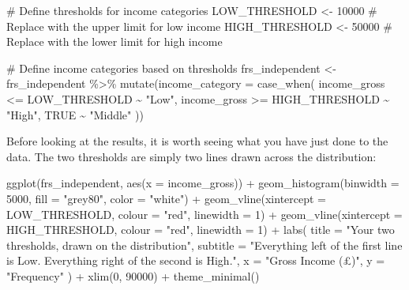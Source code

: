 \documentclass[
  letterpaper,
  DIV=11,
  numbers=noendperiod]{scrreprt}
\newenvironment{Shaded}{\begin{snugshade}}{\end{snugshade}}
\newcommand{\AttributeTok}[1]{\textcolor[rgb]{0.40,0.45,0.13}{#1}}
\newcommand{\CommentTok}[1]{\textcolor[rgb]{0.37,0.37,0.37}{#1}}
\newcommand{\ConstantTok}[1]{\textcolor[rgb]{0.56,0.35,0.01}{#1}}
\newcommand{\DecValTok}[1]{\textcolor[rgb]{0.68,0.00,0.00}{#1}}
\newcommand{\FunctionTok}[1]{\textcolor[rgb]{0.28,0.35,0.67}{#1}}
\newcommand{\NormalTok}[1]{\textcolor[rgb]{0.00,0.23,0.31}{#1}}
\newcommand{\OtherTok}[1]{\textcolor[rgb]{0.00,0.23,0.31}{#1}}
\newcommand{\SpecialCharTok}[1]{\textcolor[rgb]{0.37,0.37,0.37}{#1}}
\newcommand{\StringTok}[1]{\textcolor[rgb]{0.13,0.47,0.30}{#1}}
\begin{document}
\begin{Shaded}
\begin{Highlighting}[]
\CommentTok{\# Define thresholds for income categories }
\NormalTok{LOW\_THRESHOLD }\OtherTok{\textless{}{-}} \DecValTok{10000} \CommentTok{\# Replace with the upper limit for low income }
\NormalTok{HIGH\_THRESHOLD }\OtherTok{\textless{}{-}} \DecValTok{50000} \CommentTok{\# Replace with the lower limit for high income }

\CommentTok{\# Define income categories based on thresholds }
\NormalTok{frs\_independent }\OtherTok{\textless{}{-}}\NormalTok{ frs\_independent }\SpecialCharTok{\%\textgreater{}\%} 
    \FunctionTok{mutate}\NormalTok{(}\AttributeTok{income\_category =} \FunctionTok{case\_when}\NormalTok{( }
\NormalTok{        income\_gross }\SpecialCharTok{\textless{}=}\NormalTok{ LOW\_THRESHOLD }\SpecialCharTok{\textasciitilde{}} \StringTok{"Low"}\NormalTok{, }
\NormalTok{        income\_gross }\SpecialCharTok{\textgreater{}=}\NormalTok{ HIGH\_THRESHOLD }\SpecialCharTok{\textasciitilde{}} \StringTok{"High"}\NormalTok{, }
        \ConstantTok{TRUE} \SpecialCharTok{\textasciitilde{}} \StringTok{"Middle"}\NormalTok{ ))}
\end{Highlighting}
\end{Shaded}

Before looking at the results, it is worth seeing what you have just
done to the data. The two thresholds are simply two lines drawn across
the distribution:

\begin{Shaded}
\begin{Highlighting}[]
\FunctionTok{ggplot}\NormalTok{(frs\_independent, }\FunctionTok{aes}\NormalTok{(}\AttributeTok{x =}\NormalTok{ income\_gross)) }\SpecialCharTok{+}
  \FunctionTok{geom\_histogram}\NormalTok{(}\AttributeTok{binwidth =} \DecValTok{5000}\NormalTok{, }\AttributeTok{fill =} \StringTok{"grey80"}\NormalTok{, }\AttributeTok{color =} \StringTok{"white"}\NormalTok{) }\SpecialCharTok{+}
  \FunctionTok{geom\_vline}\NormalTok{(}\AttributeTok{xintercept =}\NormalTok{ LOW\_THRESHOLD, }\AttributeTok{colour =} \StringTok{"red"}\NormalTok{, }\AttributeTok{linewidth =} \DecValTok{1}\NormalTok{) }\SpecialCharTok{+}
  \FunctionTok{geom\_vline}\NormalTok{(}\AttributeTok{xintercept =}\NormalTok{ HIGH\_THRESHOLD, }\AttributeTok{colour =} \StringTok{"red"}\NormalTok{, }\AttributeTok{linewidth =} \DecValTok{1}\NormalTok{) }\SpecialCharTok{+}
  \FunctionTok{labs}\NormalTok{(}
    \AttributeTok{title =} \StringTok{"Your two thresholds, drawn on the distribution"}\NormalTok{,}
    \AttributeTok{subtitle =} \StringTok{"Everything left of the first line is \textquotesingle{}Low\textquotesingle{}. Everything right of the second is \textquotesingle{}High\textquotesingle{}."}\NormalTok{,}
    \AttributeTok{x =} \StringTok{"Gross Income (£)"}\NormalTok{,}
    \AttributeTok{y =} \StringTok{"Frequency"}
\NormalTok{  ) }\SpecialCharTok{+}
  \FunctionTok{xlim}\NormalTok{(}\DecValTok{0}\NormalTok{, }\DecValTok{90000}\NormalTok{) }\SpecialCharTok{+}
  \FunctionTok{theme\_minimal}\NormalTok{()}
\end{Highlighting}
\end{Shaded}
\end{document}
